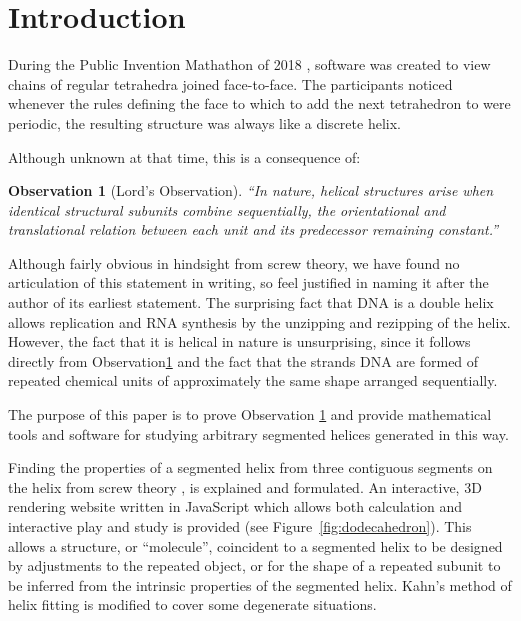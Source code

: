 \documentclass[mathematics,article,submit,pdftex,moreauthors]{Definitions/mdpi}
\newtheorem{observation}{Observation}
\begin{document}
\section{Introduction}

During the Public Invention Mathathon of 2018 \cite{read2019mathathon}, software was
created to view chains of regular tetrahedra joined face-to-face.
The participants noticed whenever the rules
defining the face to which to add the next
tetrahedron
to were periodic, the resulting
structure was always like a discrete helix.

Although unknown at that time, this is a consequence of:
\begin{observation}[Lord's Observation]
  “In nature, helical structures arise when identical structural subunits combine sequentially, the orientational and translational relation between each unit and its predecessor remaining constant.” \cite{lord2002helical}
  \label{obs:lords}
\end{observation}
Although fairly obvious in hindsight from screw theory, we have found no articulation of this statement
in writing, so feel justified in naming it after the author of its earliest statement.
The surprising fact that DNA is a double helix allows replication and RNA synthesis by the unzipping and rezipping
of the helix.
However, the fact that it is helical in nature is unsurprising, since it follows directly from Observation\ref{obs:lords} and the
fact that the strands DNA are formed of repeated chemical units of approximately the same shape arranged sequentially.

The purpose of this paper is to prove Observation \ref{obs:lords} and provide mathematical
tools and software for studying arbitrary
segmented helices generated in this way.

Finding the properties of a segmented helix from three contiguous segments on the helix from screw theory \cite{abbasi2015review,wittenburg2016kinematics,wiki:screwaxis,kahn1989defining},
is explained and formulated.
An interactive, 3D rendering website written in JavaScript which allows both calculation and
interactive play and study is provided \cite{segmentedhelixinteractive}
(see Figure~\ref{fig:dodecahedron}). This allows
a structure, or ``molecule'', coincident to a segmented helix to be designed
by adjustments to the repeated object, or for the shape of
a repeated subunit to be inferred from the intrinsic properties of the
segmented helix.
Kahn's method of helix fitting \cite{kahn1989defining,enkhbayar2008helfit,lee2007qhelix} is modified to cover some degenerate situations.
\end{document}
